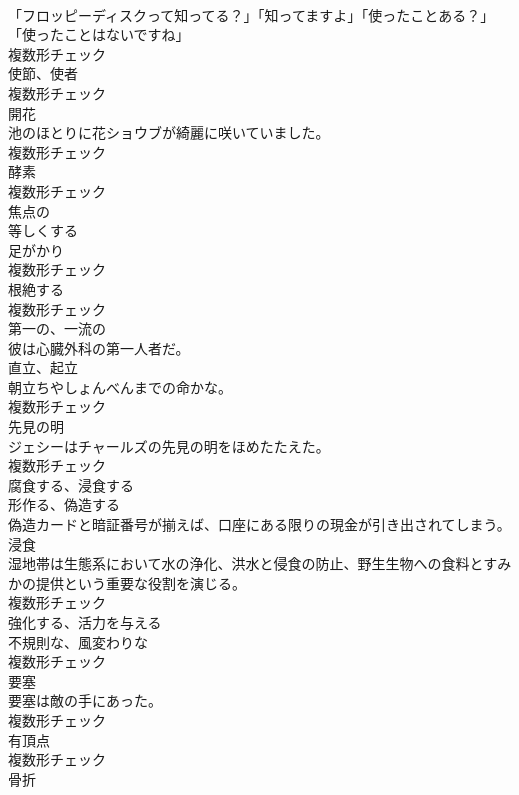 \documentclass[8pt]{extreport}
\begin{document}
\begin{CJK}{UTF8}{min}
\\	「フロッピーディスクって知ってる？」「知ってますよ」「使ったことある？」「使ったことはないですね」	
\\	複数形チェック
\\	[名詞]	使節、使者	
\\	複数形チェック
\\	[名詞]	開花	
\\	池のほとりに花ショウブが綺麗に咲いていました。	
\\	複数形チェック
\\	[名詞]	酵素	
\\	複数形チェック
\\	[形容詞]	焦点の	
\\	[動詞]	等しくする	
\\	[名詞]	足がかり	
\\	複数形チェック
\\	[名詞]	根絶する	
\\	複数形チェック
\\	[形容詞]	第一の、一流の	
\\	彼は心臓外科の第一人者だ。	
\\	[名詞]	直立、起立	
\\	朝立ちやしょんべんまでの命かな。	
\\	複数形チェック
\\	[名詞]	先見の明	
\\	ジェシーはチャールズの先見の明をほめたたえた。	
\\	複数形チェック
\\	[動詞]	腐食する、浸食する	
\\	[動詞]	形作る、偽造する	
\\	偽造カードと暗証番号が揃えば、口座にある限りの現金が引き出されてしまう。	
\\	[名詞]	浸食	
\\	湿地帯は生態系において水の浄化、洪水と侵食の防止、野生生物への食料とすみかの提供という重要な役割を演じる。	
\\	複数形チェック
\\	[動詞]	強化する、活力を与える	
\\	[名詞]	不規則な、風変わりな	
\\	複数形チェック
\\	[名詞]	要塞	
\\	要塞は敵の手にあった。	
\\	複数形チェック
\\	[名詞]	有頂点	
\\	複数形チェック
\\	[名詞]	骨折	

\end{CJK}
\end{document}
